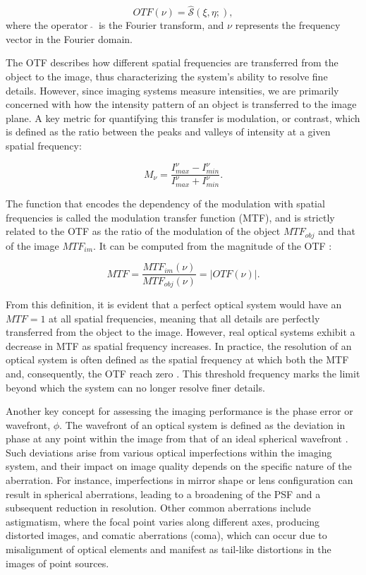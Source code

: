 \begin{equation}
  OTF(\nu) = \hat{\mathcal{S}}\left(\xi , \eta;\right),
\end{equation}
where the operator  $\ \hat{ }\ $  is the Fourier transform, and $\nu$ represents the frequency vector in the Fourier domain.

The OTF describes how different spatial frequencies are transferred from the object to the image, thus characterizing the system's ability to resolve fine details. However, since imaging systems measure intensities, we are primarily concerned with how the intensity pattern of an object is transferred to the image plane. A key metric for quantifying this transfer is modulation, or contrast, which is defined as the ratio between the peaks and valleys of intensity at a given spatial frequency:

\begin{equation}
  M _ {\nu} = \frac{I_{max} ^{\nu} - I_{min} ^{\nu}}{I_{max} ^{\nu} + I_{min} ^{\nu}}.
\end{equation}

The function that encodes the dependency of the modulation with spatial frequencies is called the modulation transfer function (MTF), and is strictly related to the OTF as the ratio of the modulation of the object $MTF_{obj}$ and that of the image $MTF_{im}$. It can be computed from the magnitude of the OTF \citep{OTF}:

\begin{equation}
  MTF = \frac{MTF_{im}(\nu)}{MTF_{obj}(\nu)} = | OTF(\nu) |.
\end{equation}

From this definition, it is evident that a perfect optical system would have an $MTF=1$ at all spatial frequencies, meaning that all details are perfectly transferred from the object to the image. However, real optical systems exhibit a decrease in MTF as spatial frequency increases. In practice, the resolution of an optical system is often defined as the spatial frequency at which both the MTF and, consequently, the OTF reach zero \citep{wfes}. This threshold frequency marks the limit beyond which the system can no longer resolve finer details. 

Another key concept for assessing the imaging performance is the phase error or wavefront, $\phi$. The wavefront of an optical system is defined as the deviation in phase at any point within the image from that of an ideal spherical wavefront \citep{WFE_def}. Such deviations arise from various optical imperfections within the imaging system, and their impact on image quality depends on the specific nature of the aberration. For instance, imperfections in mirror shape or lens configuration can result in spherical aberrations, leading to a broadening of the PSF and a subsequent reduction in resolution. Other common aberrations include astigmatism, where the focal point varies along different axes, producing distorted images, and comatic aberrations (coma), which can occur due to misalignment of optical elements and manifest as tail-like distortions in the images of point sources.

